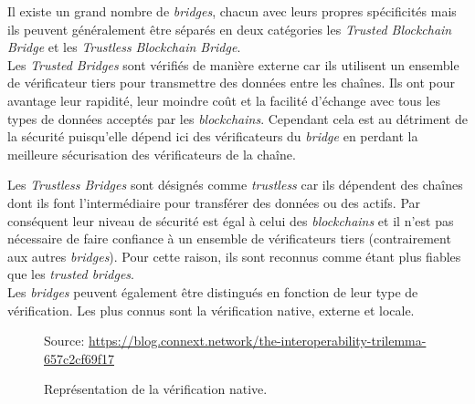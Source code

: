 Il existe un grand nombre de \textit{bridges}, chacun avec leurs propres spécificités mais ils peuvent généralement être séparés en deux catégories les \textit{Trusted Blockchain Bridge} et les \textit{Trustless Blockchain Bridge}. \\


Les \textit{Trusted Bridges} sont vérifiés de manière externe car ils utilisent un ensemble de vérificateur tiers pour transmettre des données entre les chaînes. Ils ont pour avantage leur rapidité, leur moindre coût et la facilité d'échange avec tous les types de données acceptés par les \textit{blockchains}. Cependant cela est au détriment de la sécurité puisqu'elle dépend ici des vérificateurs du \textit{bridge} en perdant la meilleure sécurisation des vérificateurs de la chaîne.\cite{EthereumBridges}

Les \textit{Trustless Bridges} sont désignés comme \textit{trustless} car ils dépendent des chaînes dont ils font l’intermédiaire pour transférer des données ou des actifs. Par conséquent leur niveau de sécurité est égal à celui des \textit{blockchains} et il n’est pas nécessaire de faire confiance à un ensemble de vérificateurs tiers (contrairement aux autres \textit{bridges}). Pour cette raison, ils sont reconnus comme étant plus fiables que les \textit{trusted bridges}.\cite{EthereumBridges}\\


 Les \textit{bridges} peuvent également être distingués en fonction de leur type de vérification. Les plus connus sont la vérification native, externe et locale.\cite{InteroperabilityBhuptani} \\

 \begin{figure}[h!]
    \centering

    {\scriptsize
            Source: \url{https://blog.connext.network/the-interoperability-trilemma-657c2cf69f17}}
    \caption{Représentation de la vérification native.}
    \label{fig:NativeVerif}
\end{figure}

